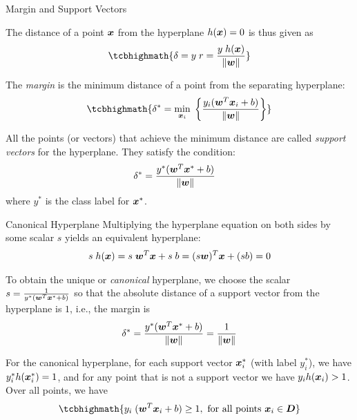 \begin{frame}{Margin and Support Vectors}

The distance of a point ${\boldsymbol x}$ from the
hyperplane $h({\boldsymbol x})=0$ is thus given as
\begin{align*}
\tcbhighmath{
  \dist = y\; r = {y\; h(\bx) \over \| \bw \|}
}
\end{align*}

The {\em margin} is the minimum distance of a point from the 
separating
hyperplane:
\begin{align*}
\tcbhighmath{
  \dist^* = \min_{\bx_i} \; \lB\{ {y_i(\bw^T\bx_i + b) \over \| \bw \|} \rB\}
}
\end{align*}

All the points (or vectors) that achieve the minimum
distance are called {\em support vectors}
for the hyperplane. They satisfy the condition:
\begin{align*}
\delta^* & = {y^*({\boldsymbol w}^T{\boldsymbol x}^* + b) \over \| {\boldsymbol w} \|}
\end{align*}
where $y^*$ is the class label for ${\boldsymbol x}^*$.
\end{frame}


\begin{frame}{Canonical Hyperplane}
Multiplying the hyperplane equation on both sides by some scalar $s$ yields an equivalent
hyperplane:
\begin{align*}
    s \; h({\boldsymbol x}) = s\; {\boldsymbol w}^T{\boldsymbol x} + s\; b = (s{\boldsymbol w})^T{\boldsymbol x} + (sb) = 0
\end{align*}

\medskip
To obtain the unique or {\em canonical} hyperplane,
we choose the scalar $s={1 \over y^*({\boldsymbol w}^T{\boldsymbol x}^* + b)}$ so
that the absolute distance of a support vector from the
hyperplane is $1$, i.e., the margin is  
\begin{align*}
  \delta^* = {y^* ({\boldsymbol w}^T{\boldsymbol x}^* + b) \over \left\lVert{\boldsymbol w}\right\rVert} = {1 \over \| {\boldsymbol w} \|}
\end{align*}

\medskip
For the canonical hyperplane, for each support vector ${\boldsymbol x}^*_i$
(with label $y_i^*$), we have $y^*_i h({\boldsymbol x}^*_i) = 1$, and for any
point that is not a support vector we have \hbox{$y_i h({\boldsymbol x}_i) > 1$}.
Over all points, we have
\begin{align*}
\tcbhighmath{
  y_i \; (\bw^T\bx_i + b) \ge 1, \mbox{ for all points } \bx_i \in \bD
}
\end{align*}
\end{frame}







